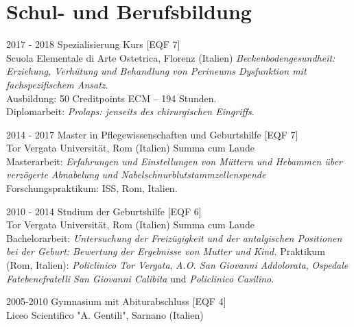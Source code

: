\documentclass[11pt]{friggeri-cv}
\begin{document}
\section{Schul- und Berufsbildung}
\begin{entrylist}
  \entry
  {2017 - 2018}
  {Spezialisierung Kurs [EQF 7]}
  {\\Scuola Elementale di Arte Ostetrica, Florenz (Italien)}
  {\emph{
      Beckenbodengesundheit: Erziehung, Verhütung und Behandlung
      von Perineums Dysfunktion mit fachspezifischem Ansatz}. \\
    Ausbildung: 50 Creditpoints ECM – 194 Stunden.\\ 
    Diplomarbeit: \emph{Prolaps: jenseits des chirurgischen Eingriffs}.\\
  }

  \entry
  {2014 - 2017}
  {Master in Pflegewissenschaften und Geburtshilfe [EQF 7]}
  {\\Tor Vergata Universit\"{a}t, Rom (Italien)}
  {
    Summa cum Laude\\
    Masterarbeit: \emph{
      Erfahrungen und Einstellungen von
      M\"{u}ttern und Hebammen \"{u}ber verz\"{o}gerte Abnabelung
      und Nabelschnurblutstammzellenspende}  
    Forschungspraktikum: ISS, Rom, Italien.\\
  }
  
  \entry
  {2010 - 2014}
  {Studium der Geburtshilfe [EQF 6]}
  {\\Tor Vergata Universit\"{a}t, Rom (Italien)}
  {
    Summa cum Laude\\
    Bachelorarbeit: \emph{
      Untersuchung der Freiz\"{u}gigkeit und der antalgischen
      Positionen bei der Geburt: Bewertung der Ergebnisse von Mutter und Kind.}
    Praktikum (Rom, Italien):
    \emph{Policlinico Tor Vergata},
    \emph{A.O. San Giovanni Addolorata}, 
    \emph{Ospedale Fatebenefratelli San Giovanni Calibita} und 
    \emph{Policlinico Casilino}.\\
  }
  
  \entry
  {2005-2010}
  {Gymnasium mit Abiturabschluss [EQF 4]}
  {\\Liceo Scientifico "A. Gentili", Sarnano (Italien)}
  {\\}
\end{entrylist}
\end{document}
